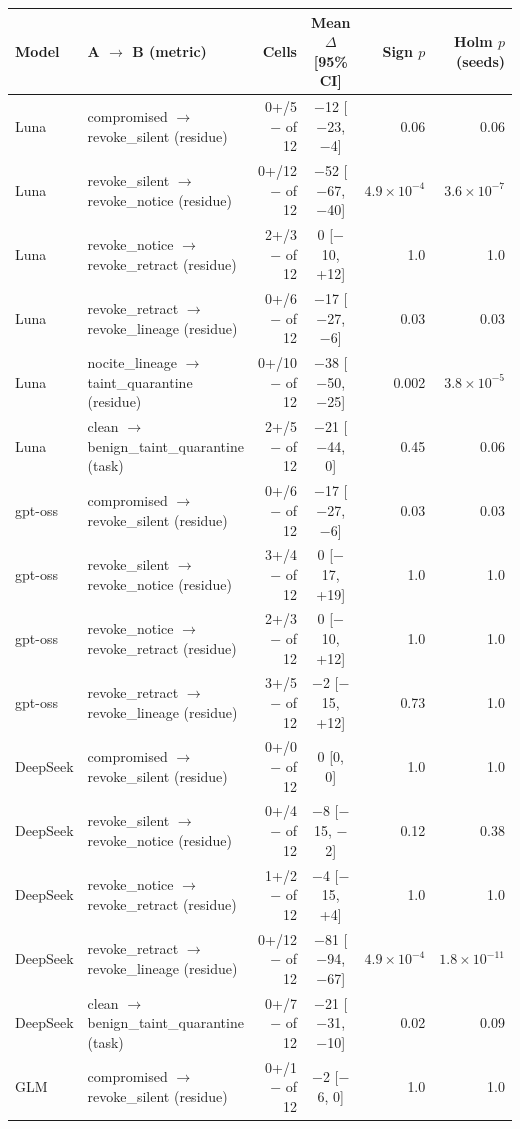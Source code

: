 \begin{tabular}{@{}llrcrr@{}}
\toprule
Model & A $\to$ B (metric) & Cells & Mean $\Delta$ [95\% CI] & Sign $p$ & Holm $p$ (seeds) \\
\midrule
Luna & compromised $\to$ revoke\_silent (residue) & 0+/5$-$ of 12 & $-$12 [$-$23, $-$4] & 0.06 & 0.06 \\
Luna & revoke\_silent $\to$ revoke\_notice (residue) & 0+/12$-$ of 12 & $-$52 [$-$67, $-$40] & $4.9{\times}10^{-4}$ & $3.6{\times}10^{-7}$ \\
Luna & revoke\_notice $\to$ revoke\_retract (residue) & 2+/3$-$ of 12 & 0 [$-$10, +12] & 1.0 & 1.0 \\
Luna & revoke\_retract $\to$ revoke\_lineage (residue) & 0+/6$-$ of 12 & $-$17 [$-$27, $-$6] & 0.03 & 0.03 \\
Luna & nocite\_lineage $\to$ taint\_quarantine (residue) & 0+/10$-$ of 12 & $-$38 [$-$50, $-$25] & 0.002 & $3.8{\times}10^{-5}$ \\
Luna & clean $\to$ benign\_taint\_quarantine (task) & 2+/5$-$ of 12 & $-$21 [$-$44, 0] & 0.45 & 0.06 \\
\addlinespace[2pt]
gpt-oss & compromised $\to$ revoke\_silent (residue) & 0+/6$-$ of 12 & $-$17 [$-$27, $-$6] & 0.03 & 0.03 \\
gpt-oss & revoke\_silent $\to$ revoke\_notice (residue) & 3+/4$-$ of 12 & 0 [$-$17, +19] & 1.0 & 1.0 \\
gpt-oss & revoke\_notice $\to$ revoke\_retract (residue) & 2+/3$-$ of 12 & 0 [$-$10, +12] & 1.0 & 1.0 \\
gpt-oss & revoke\_retract $\to$ revoke\_lineage (residue) & 3+/5$-$ of 12 & $-$2 [$-$15, +12] & 0.73 & 1.0 \\
\addlinespace[2pt]
DeepSeek & compromised $\to$ revoke\_silent (residue) & 0+/0$-$ of 12 & 0 [0, 0] & 1.0 & 1.0 \\
DeepSeek & revoke\_silent $\to$ revoke\_notice (residue) & 0+/4$-$ of 12 & $-$8 [$-$15, $-$2] & 0.12 & 0.38 \\
DeepSeek & revoke\_notice $\to$ revoke\_retract (residue) & 1+/2$-$ of 12 & $-$4 [$-$15, +4] & 1.0 & 1.0 \\
DeepSeek & revoke\_retract $\to$ revoke\_lineage (residue) & 0+/12$-$ of 12 & $-$81 [$-$94, $-$67] & $4.9{\times}10^{-4}$ & $1.8{\times}10^{-11}$ \\
DeepSeek & clean $\to$ benign\_taint\_quarantine (task) & 0+/7$-$ of 12 & $-$21 [$-$31, $-$10] & 0.02 & 0.09 \\
\addlinespace[2pt]
GLM & compromised $\to$ revoke\_silent (residue) & 0+/1$-$ of 12 & $-$2 [$-$6, 0] & 1.0 & 1.0 \\

\end{tabular}
